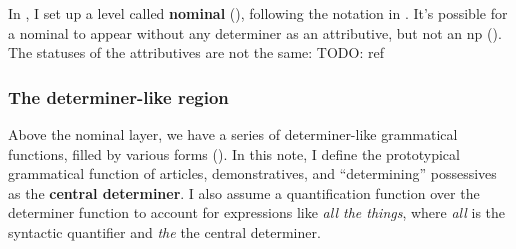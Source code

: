 \documentclass[UTF8, a4paper, oneside, scheme=plain]{ctexrep}
\newcommand*{\citepage}[1]{p.~{#1}}
\newcommand*{\concept}[1]{\textbf{#1}}
\newcommand{\corpus}[1]{\emph{#1}}
\begin{document}
In , 
I set up a level called \concept{nominal} (),
following the notation in \citet[\citepage{329}]{cgel}.
It's possible for a nominal to appear without any determiner
as an attributive,
but not an \acs{np} ().
The statuses of the attributives are not the same:
TODO: ref

\subsubsection{The determiner-like region}

Above the nominal layer, 
we have a series of determiner-like grammatical functions,
filled by various forms ().
In this note, 
I define the prototypical grammatical function of articles, demonstratives, 
and ``determining'' possessives as the \concept{central determiner}.
I also assume a quantification function over the determiner function
to account for expressions like \corpus{all the things},
where \corpus{all} is the syntactic quantifier and \corpus{the} the central determiner.
\end{document}
